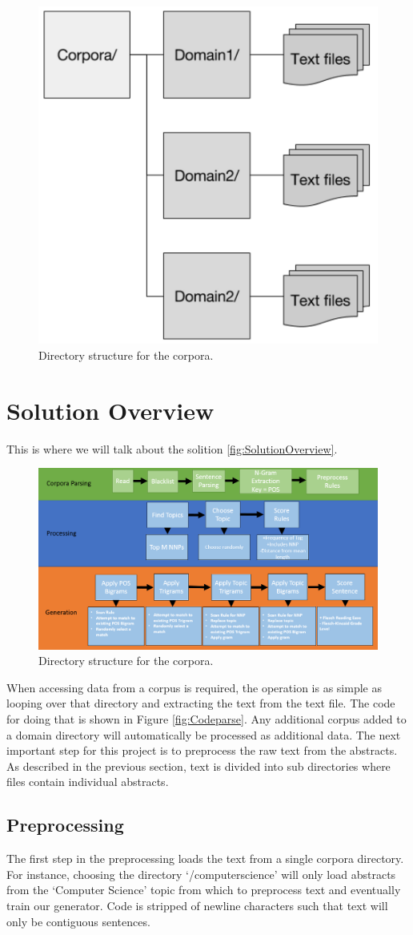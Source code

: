 \documentclass[letterpaper, 10 pt, conference]{ieeeconf}  %
\begin{document}
\begin{figure}[!ht]
	\centering
	\includegraphics[width=.4\textwidth]{filestruct}
	\caption{Directory structure for the corpora.}
	\label{fig:Directorystructure}
\end{figure}

\section{Solution Overview}
This is where we will talk about the solition \ref{fig:SolutionOverview}.
\begin{figure}[!ht]
	\centering
	\includegraphics[width=.4\textwidth]{overall_flow}
	\caption{Directory structure for the corpora.}
	\label{fig:Directorystructure}
\end{figure}


When accessing data from a corpus is required, the operation is as simple as looping over that directory and extracting the text from the text file. The code for doing that is shown in Figure \ref{fig:Codeparse}. Any additional corpus added to a domain directory will automatically be processed as additional data. The next important step for this project is to preprocess the raw text from the abstracts. As described in the previous section, text is divided into sub directories where files contain individual abstracts.

\subsection{Preprocessing}

The first step in the preprocessing loads the text from a single corpora directory. For instance, choosing the directory ‘/computerscience’ will only load abstracts from the ‘Computer Science’ topic from which to preprocess text and eventually train our generator. Code is stripped of newline characters such that text will only be contiguous sentences.
\end{document}
